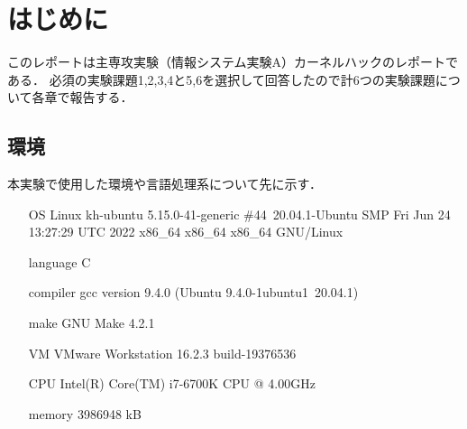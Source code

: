\chapter{はじめに}
このレポートは主専攻実験（情報システム実験A）カーネルハックのレポートである．
必須の実験課題1,2,3,4と5,6を選択して回答したので計6つの実験課題について各章で報告する．

\section{環境}
本実験で使用した環境や言語処理系について先に示す．
\begin{itemize}
    \item[OS] Linux kh-ubuntu 5.15.0-41-generic \#44~20.04.1-Ubuntu SMP Fri Jun 24 13:27:29 UTC 2022 x86\_64 x86\_64 x86\_64 GNU/Linux
    \item[language] C
    \item[compiler] gcc version 9.4.0 (Ubuntu 9.4.0-1ubuntu1~20.04.1)
    \item[make] GNU Make 4.2.1
    \item[VM] VMware Workstation 16.2.3 build-19376536
    \item[CPU] Intel(R) Core(TM) i7-6700K CPU @ 4.00GHz
    \item[memory] 3986948 kB
\end{itemize}
